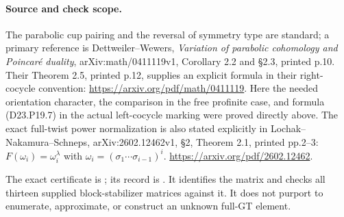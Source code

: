 \paragraph{Source and check scope.}
The parabolic cup pairing and the reversal of symmetry type
are standard; a primary reference is Dettweiler--Wewers,
\emph{Variation of parabolic cohomology and Poincar\'e
duality}, arXiv:math/0411119v1, Corollary 2.2 and \S2.3,
printed p.10. Their Theorem 2.5, printed p.12, supplies an
explicit formula in their right-cocycle convention:
\url{https://arxiv.org/pdf/math/0411119}.
Here the needed orientation character, the comparison in the
free profinite case, and formula (D23.P19.7) in the actual
left-cocycle marking were proved directly above.
The exact full-twist power normalization is also stated
explicitly in Lochak--Nakamura--Schneps,
arXiv:2602.12462v1, \S2, Theorem 2.1, printed pp.2--3:
$F(\omega_i)=\omega_i^\lambda$ with
$\omega_i=(\sigma_1\cdots\sigma_{i-1})^i$.
\url{https://arxiv.org/pdf/2602.12462}.

The exact certificate is
; its record is
. It identifies the matrix and
checks all thirteen supplied block-stabilizer matrices
against it. It does not purport to enumerate, approximate,
or construct an unknown full-GT element.
